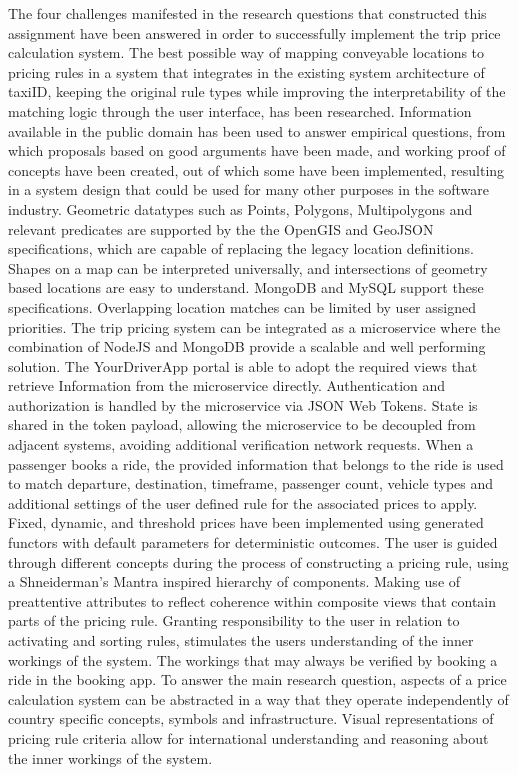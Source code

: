 The four challenges manifested in the research questions that constructed this assignment have been answered in order to successfully implement the trip price calculation system. The best possible way of mapping conveyable locations to pricing rules in a system that integrates in the existing system architecture of taxiID, keeping the original rule types while improving the interpretability of the matching logic through the user interface, has been researched. Information available in the public domain has been used to answer empirical questions, from which proposals based on good arguments have been made, and working proof of concepts have been created, out of which some have been implemented, resulting in a system design that could be used for many other purposes in the software industry. Geometric datatypes such as Points, Polygons, Multipolygons and relevant predicates are supported by the the OpenGIS and GeoJSON specifications, which are capable of replacing the legacy location definitions. Shapes on a map can be interpreted universally, and intersections of geometry based locations are easy to understand. MongoDB and MySQL support these specifications. Overlapping location matches can be limited by user assigned priorities. The trip pricing system can be integrated as a microservice where the combination of NodeJS and MongoDB provide a scalable and well performing solution. The YourDriverApp portal is able to adopt the required views that retrieve Information from the microservice directly. Authentication and authorization is handled by the microservice via JSON Web Tokens. State is shared in the token payload, allowing the microservice to be decoupled from adjacent systems, avoiding additional verification network requests. When a passenger books a ride, the provided information that belongs to the ride is used to match departure, destination, timeframe, passenger count, vehicle types and additional settings of the user defined rule for the associated prices to apply. Fixed, dynamic, and threshold prices have been implemented using generated functors with default parameters for deterministic outcomes. The user is guided through different concepts during the process of constructing a pricing rule, using a Shneiderman's Mantra inspired hierarchy of components. Making use of preattentive attributes to reflect coherence within composite views that contain parts of the pricing rule. Granting responsibility to the user in relation to activating and sorting rules, stimulates the users understanding of the inner workings of the system. The workings that may always be verified by booking a ride in the booking app. To answer the main research question, aspects of a price calculation system can be abstracted in a way that they operate independently of country specific concepts, symbols and infrastructure. Visual representations of pricing rule criteria allow for international understanding and reasoning about the inner workings of the system.


